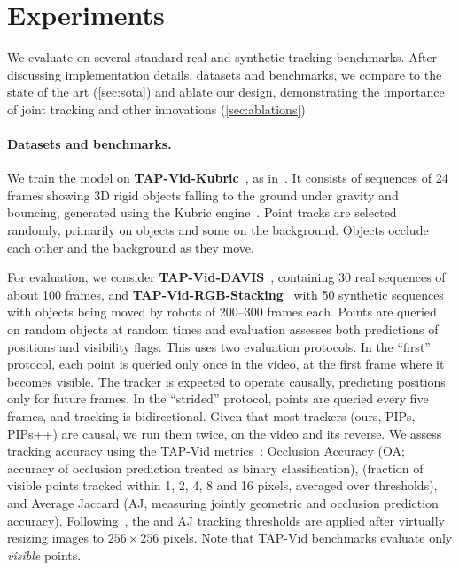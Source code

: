\section{Experiments}%
\label{sec:experiments}




We evaluate \method on several standard real and synthetic tracking benchmarks.
After discussing implementation details, datasets and benchmarks, we compare \method to the state of the art (\cref{sec:sota}) and ablate our design, demonstrating the importance of joint tracking and other innovations (\cref{sec:ablations})

\paragraph{Datasets and benchmarks.}

We train the model on \textbf{TAP-Vid-Kubric}~\cite{tapvid}, as in~\cite{tapvid,doersch2023tapir}.
It consists of sequences of 24 frames showing 3D rigid objects falling to the ground under gravity and bouncing, generated using the Kubric engine~\cite{greff2022kubric}.
Point tracks are selected randomly, primarily on objects and some on the background.
Objects occlude each other and the background as they move.

For evaluation, we consider \textbf{TAP-Vid-DAVIS}~\cite{tapvid}, containing 30 real sequences of about 100 frames, and \textbf{TAP-Vid-RGB-Stacking}~\cite{tapvid} with 50 synthetic sequences with objects being moved by robots of 200--300 frames each.
Points are queried on random objects at random times and evaluation assesses both predictions of positions and visibility flags.
This uses two evaluation protocols.
In the ``first'' protocol, each point is queried only once in the video, at the first frame where it becomes visible.
The tracker is expected to operate causally, predicting positions only for future frames.
In the ``strided'' protocol, points are queried every five frames, and tracking is bidirectional.
Given that most trackers (ours, PIPs, PIPs++) are causal, we run them twice, on the video and its reverse.
We assess tracking accuracy using the TAP-Vid metrics~\cite{tapvid}:
Occlusion Accuracy (OA\@; accuracy of occlusion prediction treated as binary classification),
\davgvis (fraction of visible points tracked within 1, 2, 4, 8 and 16 pixels, averaged over thresholds), and
Average Jaccard (AJ, measuring jointly geometric and occlusion prediction accuracy).
Following~\cite{tapvid}, the \davgvis and AJ tracking thresholds are applied after virtually resizing images to $256\times 256$ pixels.
Note that TAP-Vid benchmarks evaluate only \textit{visible} points.

